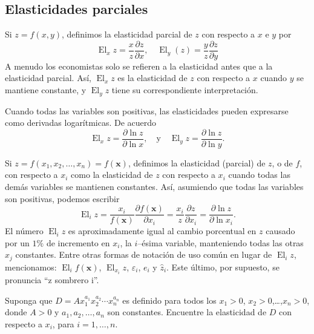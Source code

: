 \subsection{Elasticidades parciales}

Si $z=f\left(x,y\right)$, definimos la elasticidad parcial de $z$ con respecto a $x$ e $y$ por
\begin{equation}
\operatorname{El}_{x}z=\frac{x}{z}\frac{\partial z}{\partial x},\quad\operatorname{El}_{y}\left(z\right)=\frac{y}{z}\frac{\partial z}{\partial y}
\end{equation}
A menudo los economistas solo se refieren a la elasticidad antes que a la elasticidad parcial. Así, $\operatorname{El}_{x}z$ es la elasticidad de $z$ con respecto a $x$ cuando $y$ se mantiene constante, y $\operatorname{El}_{y}z$ tiene su correspondiente interpretación.

Cuando todas las variables son positivas, las elasticidades pueden expresarse como derivadas logarítmicas. De acuerdo
\begin{equation}
\operatorname{El}_{x}z=\frac{\partial\ln z}{\partial\ln x},\quad\text{y}\quad\operatorname{El}_{y}z=\frac{\partial\ln z}{\partial\ln y}.
\end{equation}

Si $z=f\left(x_{1},x_{2},\ldots,x_{n}\right)=f\left(\bm{x}\right)$, definimos la elasticidad (parcial) de $z$, o de $f$, con respecto a $x_{i}$ como la elasticidad de $z$ con respecto a $x_{i}$ cuando todas las demás variables se mantienen constantes. Así, asumiendo que todas las variables son positivas, podemos escribir
\begin{equation}
\operatorname{El}_{i}z=\frac{x_{i}}{f\left(\bm{x}\right)}\frac{\partial f\left(\bm{x}\right)}{\partial x_{i}}=\frac{x_{i}}{z}\frac{\partial z}{\partial x_{i}}=\frac{\partial\ln z}{\partial\ln x_{i}}.
\end{equation}
El número $\operatorname{El}_{i}z$ es aproximadamente igual al cambio porcentual en $z$ causado por un $1\%$ de incremento en $x_{i}$, la $i$--ésima variable, manteniendo todas las otras $x_{j}$ constantes. Entre otras formas de notación de uso común en lugar de $\operatorname{El}_{i}z$, mencionamos: $\operatorname{El}_{i}f\left(\bm{x}\right)$, $\operatorname{El}_{x_{i}}z$, $\varepsilon_{i}$, $e_{i}$ y $\hat{z}_{i}$. Este último, por supuesto, se pronuncia ``z sombrero i''.


\begin{example}
Suponga que $D=Ax^{a_{1}}_{1}x^{a_{2}}_{2}\cdots x^{a_{n}}_{n}$ es definido para todos los $x_{1}>0$, $x_{2}>0$,\ldots,$x_{n}>0$, donde $A>0$ y $a_{1},a_{2},\ldots,a_{n}$ son constantes. Encuentre la elasticidad de $D$ con respecto a $x_{i}$, para $i=1,\ldots,n$.
\end{example}

